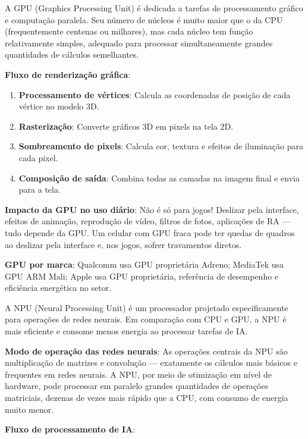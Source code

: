
A GPU (Graphics Processing Unit) é dedicada a tarefas de processamento gráfico e computação paralela. Seu número de núcleos é muito maior que o da CPU (frequentemente centenas ou milhares), mas cada núcleo tem função relativamente simples, adequado para processar simultaneamente grandes quantidades de cálculos semelhantes.

\textbf{Fluxo de renderização gráfica}:

\begin{enumerate}
  \item \textbf{Processamento de vértices}: Calcula as coordenadas de posição de cada vértice no modelo 3D.
  \item \textbf{Rasterização}: Converte gráficos 3D em pixels na tela 2D.
  \item \textbf{Sombreamento de pixels}: Calcula cor, textura e efeitos de iluminação para cada pixel.
  \item \textbf{Composição de saída}: Combina todas as camadas na imagem final e envia para a tela.
\end{enumerate}

\textbf{Impacto da GPU no uso diário}: Não é só para jogos! Deslizar pela interface, efeitos de animação, reprodução de vídeo, filtros de fotos, aplicações de RA — tudo depende da GPU. Um celular com GPU fraca pode ter quedas de quadros ao deslizar pela interface e, nos jogos, sofrer travamentos diretos.

\textbf{GPU por marca}: Qualcomm usa GPU proprietária Adreno; MediaTek usa GPU ARM Mali; Apple usa GPU proprietária, referência de desempenho e eficiência energética no setor.


A NPU (Neural Processing Unit) é um processador projetado especificamente para operações de redes neurais. Em comparação com CPU e GPU, a NPU é mais eficiente e consome menos energia ao processar tarefas de IA.

\textbf{Modo de operação das redes neurais}: As operações centrais da NPU são multiplicação de matrizes e convolução — exatamente os cálculos mais básicos e frequentes em redes neurais. A NPU, por meio de otimização em nível de hardware, pode processar em paralelo grandes quantidades de operações matriciais, dezenas de vezes mais rápido que a CPU, com consumo de energia muito menor.

\textbf{Fluxo de processamento de IA}:

